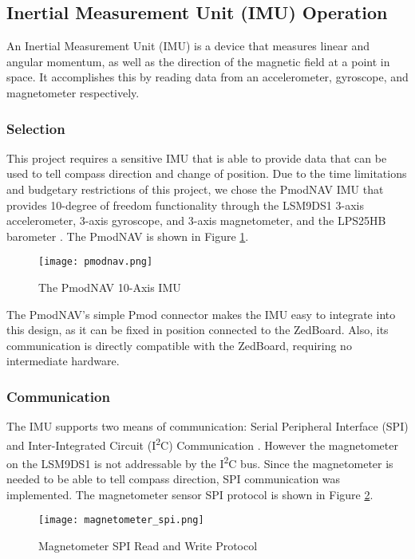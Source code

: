 \subsection{Inertial Measurement Unit (IMU) Operation}
An Inertial Measurement Unit (IMU) is a device that measures linear and angular momentum, as well as the direction of the magnetic field at a point in space. It accomplishes this by reading data from an accelerometer, gyroscope, and magnetometer respectively. 

\subsubsection{Selection}
This project requires a sensitive IMU that is able to provide data that can be used to tell compass direction and change of position. Due to the time limitations and budgetary restrictions of this project, we chose the PmodNAV IMU that provides 10-degree of freedom functionality through the LSM9DS1 3-axis accelerometer, 3-axis gyroscope, and 3-axis magnetometer, and the LPS25HB barometer \cite{lsm9ds1, lps25hd}. The PmodNAV is shown in Figure \ref{pmodnav}.

\begin{figure}[H]
	\centerline{\texttt{[image: pmodnav.png]}}
	\caption{The PmodNAV 10-Axis IMU \cite{pmodnav_ref}}
	\label{pmodnav}
\end{figure}

The PmodNAV's simple Pmod connector makes the IMU easy to integrate into this design, as it can be fixed in position connected to the ZedBoard. Also, its communication is directly compatible with the ZedBoard, requiring no intermediate hardware.

\subsubsection{Communication}
The IMU supports two means of communication: Serial Peripheral Interface (SPI) and Inter-Integrated Circuit (I\textsuperscript{2}C) Communication \cite{lsm9ds1}. However the magnetometer on the LSM9DS1 is not addressable by the I\textsuperscript{2}C bus. Since the magnetometer is needed to be able to tell compass direction, SPI communication was implemented. The magnetometer sensor SPI protocol is shown in Figure \ref{magnetometer_spi}.

\begin{figure}[H]
	\centerline{\texttt{[image: magnetometer\_spi.png]}}
	\caption{Magnetometer SPI Read and Write Protocol \cite{lsm9ds1}}
	\label{magnetometer_spi}
\end{figure}

